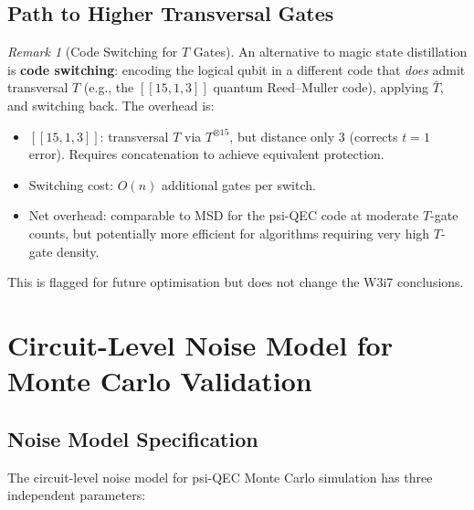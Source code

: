 \documentclass[11pt]{article}
\theoremstyle{definition}
\theoremstyle{remark}
\newtheorem{remark}[theorem]{Remark}
\begin{document}
\subsection{Path to Higher Transversal Gates}
\label{sec:higher-transversal}

\begin{remark}[Code Switching for $T$ Gates]
\label{rem:code-switching}
An alternative to magic state distillation is \textbf{code switching}:
encoding the logical qubit in a different code that \emph{does} admit
transversal $T$ (e.g., the $[[15,1,3]]$ quantum Reed--Muller code),
applying $\bar{T}$, and switching back. The overhead is:
\begin{itemize}[nosep]
  \item $[[15,1,3]]$: transversal $T$ via $T^{\otimes 15}$, but
    distance only 3 (corrects $t = 1$ error). Requires concatenation
    to achieve equivalent protection.
  \item Switching cost: $O(n)$ additional gates per switch.
  \item Net overhead: comparable to MSD for the psi-QEC code at
    moderate $T$-gate counts, but potentially more efficient for
    algorithms requiring very high $T$-gate density.
\end{itemize}
This is flagged for future optimisation but does not change the
W3i7 conclusions.
\end{remark}

\section{Circuit-Level Noise Model for Monte Carlo Validation}
\label{sec:noise-model}

\subsection{Noise Model Specification}
\label{sec:noise-spec}

The circuit-level noise model for psi-QEC Monte Carlo simulation has
three independent parameters:
\end{document}
